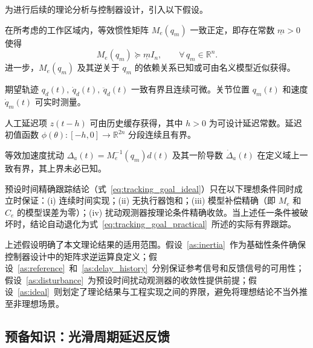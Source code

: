 为进行后续的理论分析与控制器设计，引入以下假设。

\begin{assumption}[等效惯性可逆]\label{as:inertia}
  在所考虑的工作区域内，等效惯性矩阵 \(M_e(q_m)\) 一致正定，即存在常数 \(\underline m>0\) 使得
  \[
  M_e(q_m) \succeq \underline m I_n,\qquad \forall\,q_m\in\mathbb R^n.
  \]
  进一步，\(M_e(q_m)\) 及其逆关于 \(q_m\) 的依赖关系已知或可由名义模型近似获得。
\end{assumption}

\begin{assumption}[参考轨迹有界]\label{as:reference}
  期望轨迹 \(q_d(t),\ \dot q_d(t),\ \ddot q_d(t)\) 一致有界且连续可微。关节位置 \(q_m(t)\) 和速度 \(\dot q_m(t)\) 可实时测量。
\end{assumption}

\begin{assumption}[延迟历史可获取]\label{as:delay_history}
  人工延迟项 \(z(t-h)\) 可由历史缓存获得，其中 \(h>0\) 为可设计延迟常数。延迟初值函数 \(\phi(\theta):[-h,0]\to\mathbb R^{2n}\) 分段连续且有界。
\end{assumption}

\begin{assumption}[扰动有界性]\label{as:disturbance}
  等效加速度扰动 \(\Delta_a(t) = M_e^{-1}(q_m)d(t)\) 及其一阶导数 \(\dot\Delta_a(t)\) 在定义域上一致有界，其上界未必已知。
\end{assumption}

\begin{assumption}[理想条件]\label{as:ideal}
  预设时间精确跟踪结论（式~\eqref{eq:tracking_goal_ideal}）只在以下理想条件同时成立时保证：\textup{(i)} 连续时间实现；\textup{(ii)} 无执行器饱和；\textup{(iii)} 模型补偿精确（即 \(M_e\) 和 \(C_e\) 的模型误差为零）；\textup{(iv)} 扰动观测器按理论条件精确收敛。当上述任一条件被破坏时，结论自动退化为式~\eqref{eq:tracking_goal_practical}~所述的实际有界跟踪。
\end{assumption}

上述假设明确了本文理论结果的适用范围。假设~\ref{as:inertia}~作为基础性条件确保控制器设计中的矩阵求逆运算良定义；假设~\ref{as:reference}~和~\ref{as:delay_history}~分别保证参考信号和反馈信号的可用性；假设~\ref{as:disturbance}~为预设时间扰动观测器的收敛性提供前提；假设~\ref{as:ideal}~则划定了理论结果与工程实现之间的界限，避免将理想结论不当外推至非理想场景。

\subsection{预备知识：光滑周期延迟反馈}

